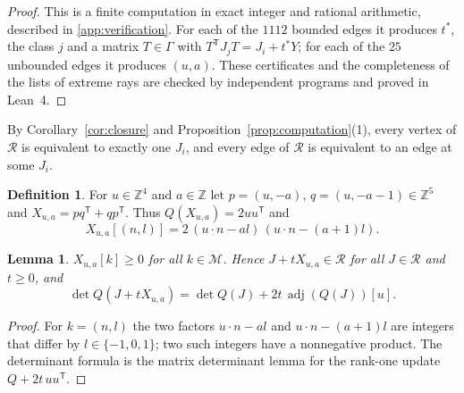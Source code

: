 \documentclass[11pt,reqno]{amsart}
\renewcommand{\_}{\origunderscore\allowbreak}
\numberwithin{equation}{section}
\theoremstyle{plain}
\newtheorem{lem}[thm]{Lemma}
\theoremstyle{definition}
\newtheorem{definition}[thm]{Definition}
\theoremstyle{remark}
\newcommand{\Z}{\mathbb{Z}}
\newcommand{\M}{\mathcal{M}}
\newcommand{\Rk}{\mathcal{R}}
\newcommand{\adj}{\operatorname{adj}}
\begin{document}
\begin{proof}
This is a finite computation in exact integer and rational arithmetic, described in \cref{app:verification}. For each of the $1112$ bounded edges it produces $t^*$, the class $j$ and a matrix $T\in\Gamma$ with $T^{\mathsf T}J_jT=J_i+t^*Y$; for each of the $25$ unbounded edges it produces $(u,a)$. These certificates and the completeness of the lists of extreme rays are checked by independent programs and proved in Lean~4.
\end{proof}

By Corollary~\ref{cor:closure} and Proposition~\ref{prop:computation}(1), every vertex of $\Rk$ is equivalent to exactly one $J_i$, and every edge of $\Rk$ is equivalent to an edge at some $J_i$.

\begin{definition}\label{def:Xua}
For $u\in\Z^4$ and $a\in\Z$ let $p=(u,-a)$, $q=(u,-a-1)\in\Z^5$ and $X_{u,a}=pq^{\mathsf T}+qp^{\mathsf T}$. Thus $Q(X_{u,a})=2uu^{\mathsf T}$ and
\[
X_{u,a}[(n,l)]=2\,(u\cdot n-al)\,(u\cdot n-(a+1)l).
\]
\end{definition}

\begin{lem}\label{lem:Xua}
$X_{u,a}[k]\ge0$ for all $k\in\M$. Hence $J+tX_{u,a}\in\Rk$ for all $J\in\Rk$ and $t\ge0$, and
\[
\det Q(J+tX_{u,a})=\det Q(J)+2t\,\adj(Q(J))[u].
\]
\end{lem}

\begin{proof}
For $k=(n,l)$ the two factors $u\cdot n-al$ and $u\cdot n-(a+1)l$ are integers that differ by $l\in\{-1,0,1\}$; two such integers have a nonnegative product. The determinant formula is the matrix determinant lemma for the rank-one update $Q+2t\,uu^{\mathsf T}$.
\end{proof}
\end{document}
